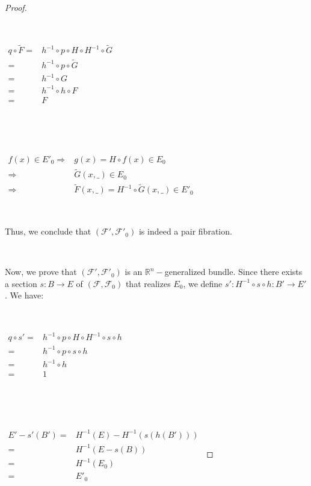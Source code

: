 \documentclass[12pt,oneside]{book}
\newcommand{\wt}{\widetilde}
\begin{document}
\begin{proof}
        \

        \
            
            $\begin{array}{rl}
                q \circ \wt{F} = & h^{-1} \circ p \circ H \circ H^{-1} \circ \wt{G} \\
                = & h^{-1} \circ p \circ \wt{G} \\
                = & h^{-1} \circ G \\
                = & h^{-1} \circ h \circ F \\
                = & F
            \end{array}$
            
        \    
 
        \

            $\begin{array}{rl}
                f(x) \in E'_{0} \Longrightarrow & g(x) = H \circ f(x) \in E_{0} \\
                \Longrightarrow & \wt{G}(x,\_) \in E_{0} \\
                \Longrightarrow & \wt{F}(x,\_) = H^{-1} \circ \wt{G}(x,\_) \in E'_{0}
            \end{array}$
        
        \
            
        Thus, we conclude that $(\mathcal{F'}, \mathcal{F'}_{0})$ is indeed a pair fibration.

        \
            
        Now, we prove that $(\mathcal{F'}, \mathcal{F'}_{0})$ is an $\mathbb{R}^n-$generalized bundle. Since there exists a section 
        $s: B \to E$ of $(\mathcal{F}, \mathcal{F}_{0})$ that realizes $E_{0}$, we define $s': H^{-1} \circ s \circ h: B' \to E'$. We have:

        \
        
            $\begin{array}{rl}
                q \circ s' = & h^{-1} \circ p \circ H \circ H^{-1} \circ s \circ h \\
                = & h^{-1} \circ p \circ s \circ h \\
                = & h^{-1} \circ h \\
                = & 1
            \end{array}$
            
        \

        \
            
            $\begin{array}{rl}
                E' - s'(B') = & H^{-1}(E) - H^{-1}(s(h(B'))) \\
                = & H^{-1}(E - s(B)) \\
                = & H^{-1}(E_{0}) \\
                = & E'_{0}
            \end{array}$
            

\end{proof}
\end{document}
